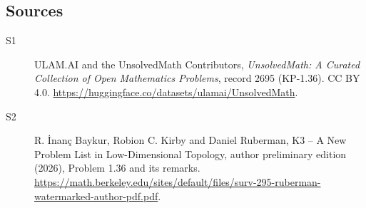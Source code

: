 \documentclass[11pt]{article}
\begin{document}
\subsection{Sources}
\begin{description}
\item[\hypertarget{source:2695:1}{S1}] ULAM.AI and the UnsolvedMath Contributors, \emph{UnsolvedMath: A Curated Collection of Open Mathematics Problems}, record 2695 (KP-1.36). CC BY 4.0. \url{https://huggingface.co/datasets/ulamai/UnsolvedMath}.
\item[\hypertarget{source:2695:2}{S2}] R. \.{I}nan\c{c} Baykur, Robion C. Kirby and Daniel Ruberman, K3 -- A New Problem List in Low-Dimensional Topology, author preliminary edition (2026), Problem 1.36 and its remarks. \url{https://math.berkeley.edu/sites/default/files/surv-295-ruberman-watermarked-author-pdf.pdf}.
\end{description}
\label{end:2695}
\end{document}

